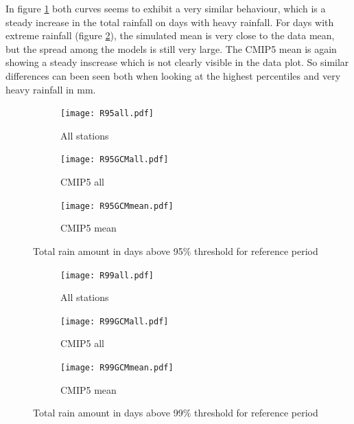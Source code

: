 \documentclass{article}
\begin{document}
In figure \ref{R95} both curves seems to exhibit a very similar behaviour, which is a steady increase in the total rainfall on days with heavy rainfall. For days with extreme rainfall (figure \ref{R99}), the simulated mean is very close to the data mean, but the spread among the models is still very large. The CMIP5 mean is again showing a steady inscrease which is not clearly visible in the data plot. So similar differences can been seen both when looking at the highest percentiles and very heavy rainfall in mm. 
\begin{figure}[H]
	\centering
	\begin{subfigure}{0.5\textwidth}
		\centering
		\texttt{[image: R95all.pdf]}
		\caption{All stations}
	\end{subfigure}%
	\begin{subfigure}{0.5\textwidth}
		\centering
		\texttt{[image: R95GCMall.pdf]}
		\caption{CMIP5 all}
	\end{subfigure}
	\begin{subfigure}{0.5\textwidth}
		\centering
		\texttt{[image: R95GCMmean.pdf]}
		\caption{CMIP5 mean}
	\end{subfigure}
	\caption{Total rain amount in days above 95\% threshold for reference period}
	\label{R95}
\end{figure}

\begin{figure}[H]
	\centering
	\begin{subfigure}{0.5\textwidth}
		\centering
		\texttt{[image: R99all.pdf]}
		\caption{All stations}
	\end{subfigure}%
	\begin{subfigure}{0.5\textwidth}
		\centering
		\texttt{[image: R99GCMall.pdf]}
		\caption{CMIP5 all}
	\end{subfigure}
	\begin{subfigure}{0.5\textwidth}
		\centering
		\texttt{[image: R99GCMmean.pdf]}
		\caption{CMIP5 mean}
	\end{subfigure}
	\caption{Total rain amount in days above 99\% threshold for reference period}
	\label{R99}
\end{figure}
\end{document}
